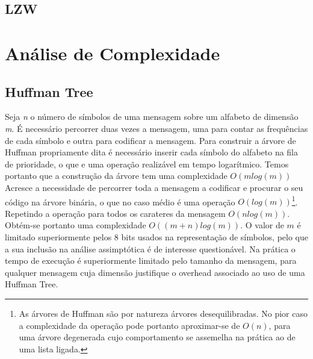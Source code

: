 \documentclass[a4paper,12pt,titlepage]{article}
\begin{document}
\subsection{LZW}

\section{Análise de Complexidade}\label{Análise de Complexidade}
\subsection{Huffman Tree}
Seja \emph{n} o número de símbolos de uma mensagem sobre um alfabeto de dimensão \emph{m}.
É necessário percorrer duas vezes a mensagem, uma para contar as frequências de cada símbolo e outra para codificar a mensagem. Para construir a árvore de Huffman propriamente dita é necessário inserir cada símbolo do alfabeto na fila de prioridade, o que e uma operação realizável em tempo logarítmico. Temos portanto que a construção da árvore tem uma complexidade $O(mlog(m))$ Acresce a necessidade de percorrer toda a mensagem a codificar e procurar o seu código na árvore binária, o que no caso médio é uma operação $O(log(m))$\footnote{As árvores de Huffman são por natureza árvores desequilibradas. No pior caso a complexidade da operação pode portanto aproximar-se de $O(n)$, para uma árvore degenerada cujo comportamento se assemelha na prática ao de uma lista ligada.}. Repetindo a operação para todos os carateres da mensagem $O(nlog(m))$. Obtém-se portanto uma complexidade $O( (m+n)log(m))$. O valor de $m$ é limitado superiormente pelos 8 bits usados na representação de símbolos, pelo que a sua inclusão na análise assimptótica é de interesse questionável. Na prática o tempo de execução é superiormente limitado pelo tamanho da mensagem, para qualquer mensagem cuja dimensão justifique o overhead associado ao uso de uma Huffman Tree.
\end{document}
